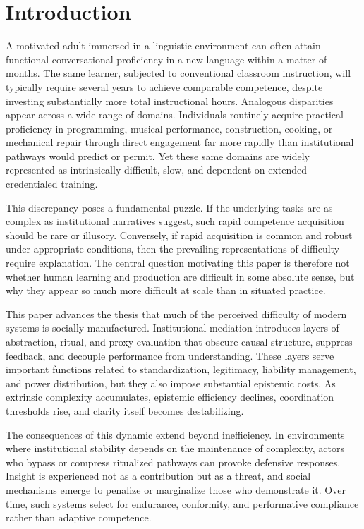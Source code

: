 \documentclass[11pt]{article}
\begin{document}
\newpage
\section{Introduction}

A motivated adult immersed in a linguistic environment can often attain functional conversational proficiency in a new language within a matter of months. The same learner, subjected to conventional classroom instruction, will typically require several years to achieve comparable competence, despite investing substantially more total instructional hours. Analogous disparities appear across a wide range of domains. Individuals routinely acquire practical proficiency in programming, musical performance, construction, cooking, or mechanical repair through direct engagement far more rapidly than institutional pathways would predict or permit. Yet these same domains are widely represented as intrinsically difficult, slow, and dependent on extended credentialed training.

This discrepancy poses a fundamental puzzle. If the underlying tasks are as complex as institutional narratives suggest, such rapid competence acquisition should be rare or illusory. Conversely, if rapid acquisition is common and robust under appropriate conditions, then the prevailing representations of difficulty require explanation. The central question motivating this paper is therefore not whether human learning and production are difficult in some absolute sense, but why they appear so much more difficult at scale than in situated practice.

This paper advances the thesis that much of the perceived difficulty of modern systems is socially manufactured. Institutional mediation introduces layers of abstraction, ritual, and proxy evaluation that obscure causal structure, suppress feedback, and decouple performance from understanding. These layers serve important functions related to standardization, legitimacy, liability management, and power distribution, but they also impose substantial epistemic costs. As extrinsic complexity accumulates, epistemic efficiency declines, coordination thresholds rise, and clarity itself becomes destabilizing.

The consequences of this dynamic extend beyond inefficiency. In environments where institutional stability depends on the maintenance of complexity, actors who bypass or compress ritualized pathways can provoke defensive responses. Insight is experienced not as a contribution but as a threat, and social mechanisms emerge to penalize or marginalize those who demonstrate it. Over time, such systems select for endurance, conformity, and performative compliance rather than adaptive competence.
\end{document}
